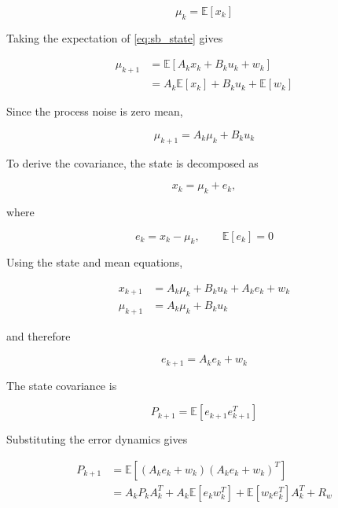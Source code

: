 \begin{equation}
    \mu_k=\mathbb{E}[x_k]
\end{equation}

Taking the expectation of \cref{eq:sb_state} gives

\begin{align}
    \mu_{k+1}
    &=
    \mathbb{E}
    \left[
        A_kx_k+B_ku_k+w_k
    \right] \\
    &=
    A_k\mathbb{E}[x_k]
    +
    B_ku_k
    +
    \mathbb{E}[w_k]
\end{align}

Since the process noise is zero mean,

\begin{equation}
    \boxed{
    \mu_{k+1}
    =
    A_k\mu_k+B_ku_k
    }
    \label{eq:sb_mean}
\end{equation}

To derive the covariance, the state is decomposed as

\begin{equation}
    x_k=\mu_k+e_k,
\end{equation}

where

\begin{equation}
    e_k=x_k-\mu_k,
    \qquad
    \mathbb{E}[e_k]=0
\end{equation}

Using the state and mean equations,

\begin{align}
    x_{k+1}
    &=
    A_k\mu_k+B_ku_k+A_ke_k+w_k\\
    \mu_{k+1}
    &=
    A_k\mu_k+B_ku_k
\end{align}

and therefore

\begin{equation}
    e_{k+1}
    =
    A_ke_k+w_k
\end{equation}

The state covariance is

\begin{equation}
    P_{k+1}
    =
    \mathbb{E}
    \left[
        e_{k+1}e_{k+1}^T
    \right]
\end{equation}

Substituting the error dynamics gives

\begin{align}
    P_{k+1}
    &=
    \mathbb{E}
    \left[
        (A_ke_k+w_k)
        (A_ke_k+w_k)^T
    \right]\\
    &=
    A_kP_kA_k^T
    +
    A_k\mathbb{E}[e_kw_k^T]
    +
    \mathbb{E}[w_ke_k^T]A_k^T
    +
    R_w
\end{align}

